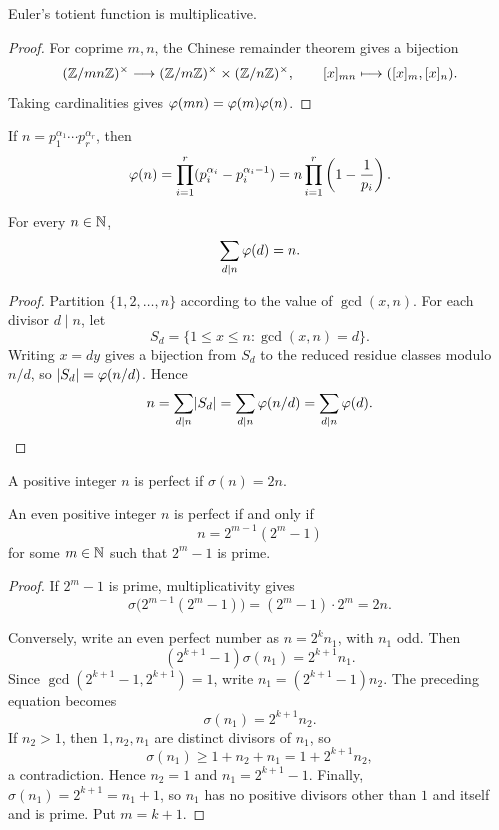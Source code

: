 \begin{thm}
Euler's totient function is multiplicative.
\end{thm}
\begin{proof}
For coprime $m,n$, the Chinese remainder theorem gives a bijection
\[
 (\Z/mn\Z)^\times\longrightarrow
 (\Z/m\Z)^\times\times(\Z/n\Z)^\times,
 \qquad [x]_{mn}\longmapsto([x]_m,[x]_n).
\]
Taking cardinalities gives $\totient(mn)=\totient(m)\totient(n)$.
\end{proof}

\begin{cor}
If $n=p_1^{\alpha_1}\cdots p_r^{\alpha_r}$, then
\[
 \totient(n)=\prod_{i=1}^r(p_i^{\alpha_i}-p_i^{\alpha_i-1})
 =n\prod_{i=1}^r\left(1-\frac1{p_i}\right).
\]
\end{cor}

\begin{thm}
For every $n\in\N$,
\[
 \sum_{d\mid n}\totient(d)=n.
\]
\end{thm}
\begin{proof}
Partition $\{1,2,\ldots,n\}$ according to the value of $\gcd(x,n)$.  For each divisor $d\mid n$, let
\[
 S_d=\{1\le x\le n:\gcd(x,n)=d\}.
\]
Writing $x=dy$ gives a bijection from $S_d$ to the reduced residue classes modulo $n/d$, so
$\abs*{S_d}=\totient(n/d)$.  Hence
\[
 n=\sum_{d\mid n}\abs*{S_d}
 =\sum_{d\mid n}\totient(n/d)
 =\sum_{d\mid n}\totient(d).
\]
\end{proof}

\begin{de}
A positive integer $n$ is perfect if $\sigma(n)=2n$.
\end{de}

\begin{thm}
An even positive integer $n$ is perfect if and only if
\[
 n=2^{m-1}(2^m-1)
\]
for some $m\in\N$ such that $2^m-1$ is prime.
\end{thm}
\begin{proof}
If $2^m-1$ is prime, multiplicativity gives
\[
 \sigma\bigl(2^{m-1}(2^m-1)\bigr)
 =(2^m-1)\cdot 2^m=2n.
\]

Conversely, write an even perfect number as $n=2^k n_1$, with $n_1$ odd.  Then
\[
 (2^{k+1}-1)\sigma(n_1)=2^{k+1}n_1.
\]
Since $\gcd(2^{k+1}-1,2^{k+1})=1$, write
$n_1=(2^{k+1}-1)n_2$.  The preceding equation becomes
\[
 \sigma(n_1)=2^{k+1}n_2.
\]
If $n_2>1$, then $1,n_2,n_1$ are distinct divisors of $n_1$, so
\[
 \sigma(n_1)\ge1+n_2+n_1=1+2^{k+1}n_2,
\]
a contradiction.  Hence $n_2=1$ and $n_1=2^{k+1}-1$.  Finally,
$\sigma(n_1)=2^{k+1}=n_1+1$, so $n_1$ has no positive divisors other than $1$ and itself and is prime.  Put $m=k+1$.
\end{proof}

